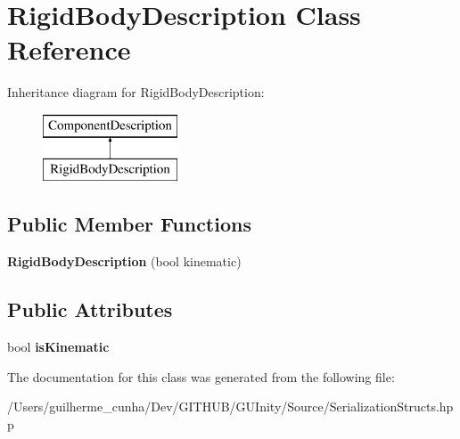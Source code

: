 \hypertarget{class_rigid_body_description}{}\section{Rigid\+Body\+Description Class Reference}
\label{class_rigid_body_description}
Inheritance diagram for Rigid\+Body\+Description\+:\begin{figure}[H]
\begin{center}
\leavevmode
\includegraphics[height=2.000000cm]{class_rigid_body_description}
\end{center}
\end{figure}
\subsection*{Public Member Functions}
\begin{DoxyCompactItemize}
\item 
\hypertarget{class_rigid_body_description_a1c0f0ca31631e710b319e6e641f153f0}{}{\bfseries Rigid\+Body\+Description} (bool kinematic)\label{class_rigid_body_description_a1c0f0ca31631e710b319e6e641f153f0}

\end{DoxyCompactItemize}
\subsection*{Public Attributes}
\begin{DoxyCompactItemize}
\item 
\hypertarget{class_rigid_body_description_ae14f3e10a9888a4906638864c7a2ad3c}{}bool {\bfseries is\+Kinematic}\label{class_rigid_body_description_ae14f3e10a9888a4906638864c7a2ad3c}

\end{DoxyCompactItemize}


The documentation for this class was generated from the following file\+:\begin{DoxyCompactItemize}
\item 
/\+Users/guilherme\+\_\+cunha/\+Dev/\+G\+I\+T\+H\+U\+B/\+G\+U\+Inity/\+Source/Serialization\+Structs.\+hpp\end{DoxyCompactItemize}
